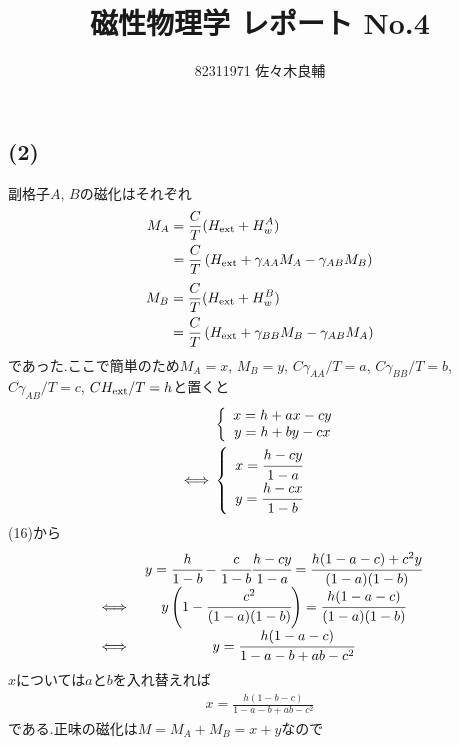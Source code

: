 \documentclass[uplatex,a4j,11pt,dvipdfmx]{jsarticle}
\newcommand{\gaa}{\gamma_{AA}}
\newcommand{\gbb}{\gamma_{BB}}
\newcommand{\gab}{\gamma_{AB}}
\begin{document}
\title{磁性物理学 レポート No.4}
\author{82311971 佐々木良輔}
\date{}
\maketitle
\subsection*{(2)}
副格子$A$, $B$の磁化はそれぞれ
\begin{align}
  \begin{split}
    M_A&=\frac{C}{T}(H_{\rm ext}+H_w^A)\\
    &=\frac{C}{T}\left(H_{\rm ext}+{\gaa}M_A-{\gab}M_B\right)
  \end{split}
\end{align}
\begin{align}
  \begin{split}
    M_B&=\frac{C}{T}(H_{\rm ext}+H_w^B)\\
    &=\frac{C}{T}\left(H_{\rm ext}+{\gbb}M_B-{\gab}M_A\right)
  \end{split}
\end{align}
であった.ここで簡単のため$M_A=x$, $M_B=y$, $C{\gaa}/T=a$,
$C{\gbb}/T=b$, $C{\gab}/T=c$, $CH_{\rm ext}/T=h$と置くと
\begin{align}
    &\left\{
    \begin{array}{c}
      x=h+ax-cy\\
      y=h+by-cx
    \end{array}\right.\\
    \iff&\left\{
    \begin{array}{c}
      x=\cfrac{h-cy}{1-a}\\
      y=\cfrac{h-cx}{1-b}
    \end{array}\right.
\end{align}
(16)から
\begin{align}
  \begin{array}{cc}
    &y=\cfrac{h}{1-b}-\cfrac{c}{1-b}\cfrac{h-cy}{1-a}=\cfrac{h(1-a-c)+c^2y}{(1-a)(1-b)}\\
    \iff&y\left(1-\cfrac{c^2}{(1-a)(1-b)}\right)=\cfrac{h(1-a-c)}{(1-a)(1-b)}\\
    \iff&y=\cfrac{h(1-a-c)}{1-a-b+ab-c^2}
  \end{array}
\end{align}
$x$については$a$と$b$を入れ替えれば
\begin{align}
  x=\frac{h(1-b-c)}{1-a-b+ab-c^2}
\end{align}
である.正味の磁化は$M=M_A+M_B=x+y$なので
\end{document}
